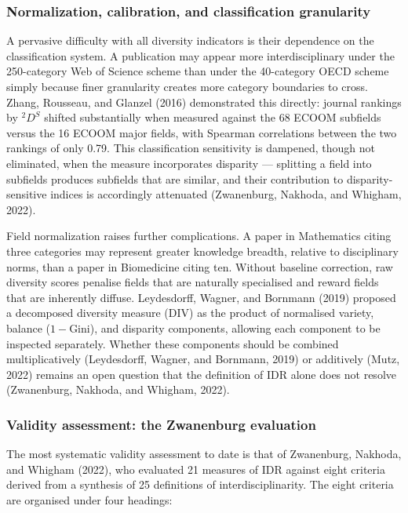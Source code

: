 \documentclass[
]{article}
\begin{document}
\hypertarget{normalization-calibration-and-classification-granularity}{%
\subsubsection{Normalization, calibration, and classification
granularity}\label{normalization-calibration-and-classification-granularity}}

A pervasive difficulty with all diversity indicators is their dependence
on the classification system. A publication may appear more
interdisciplinary under the 250-category Web of Science scheme than
under the 40-category OECD scheme simply because finer granularity
creates more category boundaries to cross. Zhang, Rousseau, and Glanzel
(2016) demonstrated this directly: journal rankings by \({}^2D^S\)
shifted substantially when measured against the 68 ECOOM subfields
versus the 16 ECOOM major fields, with Spearman correlations between the
two rankings of only 0.79. This classification sensitivity is dampened,
though not eliminated, when the measure incorporates disparity ---
splitting a field into subfields produces subfields that are similar,
and their contribution to disparity-sensitive indices is accordingly
attenuated (Zwanenburg, Nakhoda, and Whigham, 2022).

Field normalization raises further complications. A paper in Mathematics
citing three categories may represent greater knowledge breadth,
relative to disciplinary norms, than a paper in Biomedicine citing ten.
Without baseline correction, raw diversity scores penalise fields that
are naturally specialised and reward fields that are inherently diffuse.
Leydesdorff, Wagner, and Bornmann (2019) proposed a decomposed diversity
measure (DIV) as the product of normalised variety, balance
(\(1 - \text{Gini}\)), and disparity components, allowing each component
to be inspected separately. Whether these components should be combined
multiplicatively (Leydesdorff, Wagner, and Bornmann, 2019) or additively
(Mutz, 2022) remains an open question that the definition of IDR alone
does not resolve (Zwanenburg, Nakhoda, and Whigham, 2022).

\hypertarget{validity-assessment-the-zwanenburg-evaluation}{%
\subsubsection{Validity assessment: the Zwanenburg
evaluation}\label{validity-assessment-the-zwanenburg-evaluation}}

The most systematic validity assessment to date is that of Zwanenburg,
Nakhoda, and Whigham (2022), who evaluated 21 measures of IDR against
eight criteria derived from a synthesis of 25 definitions of
interdisciplinarity. The eight criteria are organised under four
headings:
\end{document}
